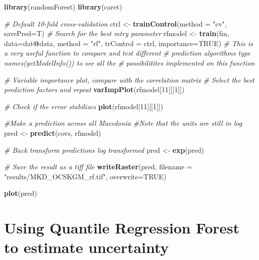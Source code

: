 \documentclass[10pt,b5paper,]{book}
\newenvironment{Shaded}{\begin{snugshade}}{\end{snugshade}}
\newcommand{\CommentTok}[1]{\textcolor[rgb]{0.56,0.35,0.01}{\textit{#1}}}
\newcommand{\DataTypeTok}[1]{\textcolor[rgb]{0.13,0.29,0.53}{#1}}
\newcommand{\DecValTok}[1]{\textcolor[rgb]{0.00,0.00,0.81}{#1}}
\newcommand{\KeywordTok}[1]{\textcolor[rgb]{0.13,0.29,0.53}{\textbf{#1}}}
\newcommand{\NormalTok}[1]{#1}
\newcommand{\OperatorTok}[1]{\textcolor[rgb]{0.81,0.36,0.00}{\textbf{#1}}}
\newcommand{\OtherTok}[1]{\textcolor[rgb]{0.56,0.35,0.01}{#1}}
\newcommand{\StringTok}[1]{\textcolor[rgb]{0.31,0.60,0.02}{#1}}
\theoremstyle{definition}
\theoremstyle{definition}
\theoremstyle{definition}
\theoremstyle{remark}
\begin{document}
\begin{Shaded}
\begin{Highlighting}[]
\KeywordTok{library}\NormalTok{(randomForest)}
\KeywordTok{library}\NormalTok{(caret)}

\CommentTok{# Default 10-fold cross-validation}
\NormalTok{ctrl <-}\StringTok{ }\KeywordTok{trainControl}\NormalTok{(}\DataTypeTok{method =} \StringTok{"cv"}\NormalTok{, }\DataTypeTok{savePred=}\NormalTok{T)}
\CommentTok{# Search for the best mtry parameter}
\NormalTok{rfmodel <-}\StringTok{ }\KeywordTok{train}\NormalTok{(fm, }\DataTypeTok{data=}\NormalTok{dat}\OperatorTok{@}\NormalTok{data, }\DataTypeTok{method =} \StringTok{"rf"}\NormalTok{, }\DataTypeTok{trControl =}\NormalTok{ ctrl, }
             \DataTypeTok{importance=}\OtherTok{TRUE}\NormalTok{)}
\CommentTok{# This is a very useful function to compare and test different }
\CommentTok{# prediction algorithms type names(getModelInfo()) to see all the }
\CommentTok{# possibilitites implemented on this function}


\CommentTok{# Variable importance plot, compare with the correlation matrix}
\CommentTok{# Select the best prediction factors and repeat  }
\KeywordTok{varImpPlot}\NormalTok{(rfmodel[}\DecValTok{11}\NormalTok{][[}\DecValTok{1}\NormalTok{]])}

\CommentTok{# Check if the error stabilizes }
\KeywordTok{plot}\NormalTok{(rfmodel[}\DecValTok{11}\NormalTok{][[}\DecValTok{1}\NormalTok{]])}

\CommentTok{#Make a prediction across all Macedonia}
\CommentTok{#Note that the units are still in log}
\NormalTok{pred <-}\StringTok{ }\KeywordTok{predict}\NormalTok{(covs, rfmodel)}

\CommentTok{# Back transform predictions log transformed}
\NormalTok{pred <-}\StringTok{ }\KeywordTok{exp}\NormalTok{(pred)}

\CommentTok{# Save the result as a tiff file}
\KeywordTok{writeRaster}\NormalTok{(pred, }\DataTypeTok{filename =} \StringTok{"results/MKD_OCSKGM_rf.tif"}\NormalTok{,}
            \DataTypeTok{overwrite=}\OtherTok{TRUE}\NormalTok{)}


\KeywordTok{plot}\NormalTok{(pred)}
\end{Highlighting}
\end{Shaded}

\clearpage

\hypertarget{cd:quantreg}{%
\section{Using Quantile Regression Forest to estimate
uncertainty}\label{cd:quantreg}}
\end{document}
